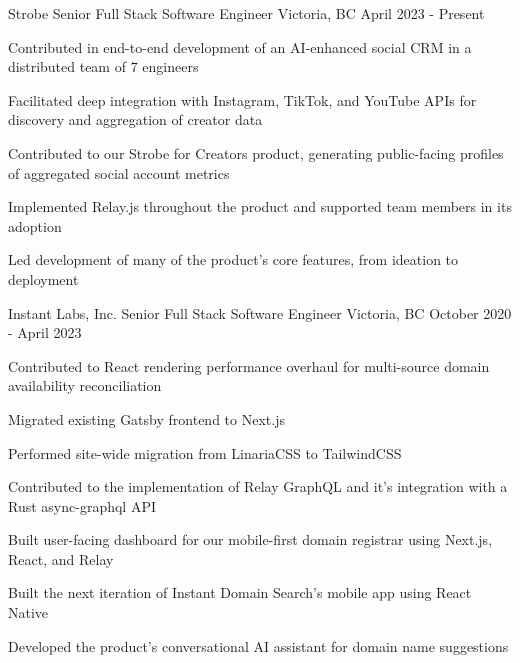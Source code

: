


\begin{cventries}


\cventry
{Strobe} %
{Senior Full Stack Software Engineer} %
{Victoria, BC} %
{April 2023 - Present} %
{ %
\begin{cvitems}
\item {Contributed in end-to-end development of an AI-enhanced social CRM in a distributed team of 7 engineers}
\item {Facilitated deep integration with Instagram, TikTok, and YouTube APIs for discovery and aggregation of creator data}
\item {Contributed to our Strobe for Creators product, generating public-facing profiles of aggregated social account metrics}
\item {Implemented Relay.js throughout the product and supported team members in its adoption}
\item {Led development of many of the product's core features, from ideation to deployment}
\end{cvitems}
}


\cventry
{Instant Labs, Inc.} %
{Senior Full Stack Software Engineer} %
{Victoria, BC} %
{October 2020 - April 2023} %
{ %
\begin{cvitems}
\item {Contributed to React rendering performance overhaul for multi-source domain availability reconciliation}
\item {Migrated existing Gatsby frontend to Next.js}
\item {Performed site-wide migration from LinariaCSS to TailwindCSS}
\item {Contributed to the implementation of Relay GraphQL and it's integration with a Rust async-graphql API}
\item {Built user-facing dashboard for our mobile-first domain registrar using Next.js, React, and Relay}
\item {Built the next iteration of Instant Domain Search's mobile app using React Native}
\item {Developed the product's conversational AI assistant for domain name suggestions}
\end{cvitems}
}


\end{cventries}
